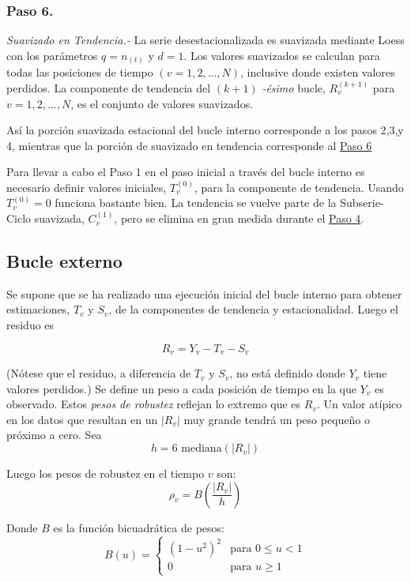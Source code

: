 \documentclass[12pt,oneside]{book}\usepackage[]{graphicx}\usepackage[]{color}
\theoremstyle{definition} %
\begin{document}
\subsubsection{Paso 6.} \textit{Suavizado en Tendencia.-}
\label{sbsec:paso6}
La serie desestacionalizada es suavizada mediante Loess con los parámetros $q=n_{(t)}$ y $d=1$. Los valores suavizados se calculan para todas las posiciones de tiempo $(v=1,2,...,N)$, inclusive donde existen valores perdidos. La componente de tendencia del $(k+1)$ \textit{-ésimo} bucle, $R_v^{(k+1)}$ para $v=1,2,...,N$, es el conjunto de valores suavizados. 


Así la porción suavizada estacional del bucle interno corresponde a los pasos 2,3,y 4, mientras que la porción de suavizado en tendencia corresponde al \hyperref[sbsec:paso6]{Paso 6}

Para llevar a cabo el Paso 1 en el paso inicial a través del bucle interno es necesario definir valores iniciales, $T_v^{(0)}$, para la componente de tendencia. Usando $T_v^{(0)}=0$ funciona bastante bien. La tendencia se vuelve parte de la Subserie-Ciclo suavizada, $C_v^{(1)}$, pero se elimina en gran medida durante el 
\hyperref[sbsec:paso4]{Paso 4}.


\subsection{Bucle externo}
Se supone que se ha realizado una ejecución inicial del bucle interno para obtener estimaciones, $T_v$ y $S_v$, de la componentes de tendencia y estacionalidad. Luego el residuo es

$$R_v = Y_v - T_v - S_v$$

(Nótese que el residuo, a diferencia de $T_v$ y $S_v$, no está definido donde $Y_v$ tiene valores perdidos.) 
Se define un peso a cada posición de tiempo en la que $Y_v$ es observado. Estos \textit{pesos de robustez} reflejan lo extremo que es $R_v$. Un valor atípico en los datos que resultan en un $|R_v|$ muy grande tendrá un peso pequeño o próximo a cero. Sea
$$h=6 \text{ mediana}(|R_v|)$$

Luego los pesos de robustez en el tiempo $v$ son:
$$\rho_v=B \left( \frac{|R_v|}{h}  \right)$$

Donde $B$ es la función bicuadrática de pesos:
\[
B(u)=
\left\{\begin{matrix}
(1-u^2)^2 & \text{para } 0\leq u < 1  \\ 
0 & \text{para } u\geq 1
\end{matrix}\right.
\] 
\end{document}

